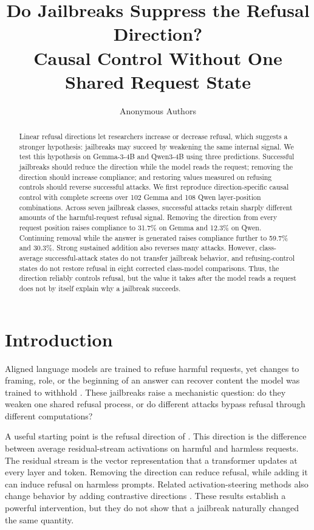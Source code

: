 \documentclass{article}
\title{Do Jailbreaks Suppress the Refusal Direction?\\Causal Control Without One Shared Request State}
\author{Anonymous Authors}
\begin{document}
\maketitle

\begin{abstract}
Linear refusal directions let researchers increase or decrease refusal, which suggests a stronger hypothesis: jailbreaks may succeed by weakening the same internal signal. We test this hypothesis on Gemma-3-4B and Qwen3-4B using three predictions. Successful jailbreaks should reduce the direction while the model reads the request; removing the direction should increase compliance; and restoring values measured on refusing controls should reverse successful attacks. We first reproduce direction-specific causal control with complete screens over 102 Gemma and 108 Qwen layer-position combinations. Across seven jailbreak classes, successful attacks retain sharply different amounts of the harmful-request refusal signal. Removing the direction from every request position raises compliance to 31.7\% on Gemma and 12.3\% on Qwen. Continuing removal while the answer is generated raises compliance further to 59.7\% and 30.3\%. Strong sustained addition also reverses many attacks. However, class-average successful-attack states do not transfer jailbreak behavior, and refusing-control states do not restore refusal in eight corrected class-model comparisons. Thus, the direction reliably controls refusal, but the value it takes after the model reads a request does not by itself explain why a jailbreak succeeds.
\end{abstract}

\section{Introduction}

Aligned language models are trained to refuse harmful requests, yet changes to framing, role, or the beginning of an answer can recover content the model was trained to withhold \citep{wei2023jailbroken,zou2023universal,zhu2025advprefix}. These jailbreaks raise a mechanistic question: do they weaken one shared refusal process, or do different attacks bypass refusal through different computations?

A useful starting point is the refusal direction of \citet{arditi2024refusal}. This direction is the difference between average residual-stream activations on harmful and harmless requests. The residual stream is the vector representation that a transformer updates at every layer and token. Removing the direction can reduce refusal, while adding it can induce refusal on harmless prompts. Related activation-steering methods also change behavior by adding contrastive directions \citep{panickssery2023steering}. These results establish a powerful intervention, but they do not show that a jailbreak naturally changed the same quantity.
\end{document}
